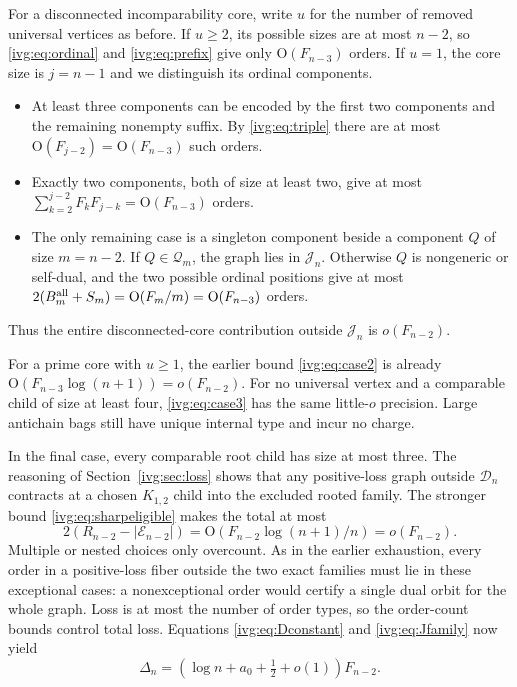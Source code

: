 \documentclass[11pt,letterpaper]{article}
\theoremstyle{definition}\newtheorem{definition}[theorem]{Definition}
\theoremstyle{remark}\newtheorem{remark}[theorem]{Remark}
\newcommand{\OO}{\mathrm O}
\begin{document}
For a disconnected incomparability core, write $u$ for the number of removed universal vertices as before. If $u\ge2$, its possible sizes are at most $n-2$, so \eqref{ivg:eq:ordinal} and \eqref{ivg:eq:prefix} give only $\OO(F_{n-3})$ orders. If $u=1$, the core size is $j=n-1$ and we distinguish its ordinal components.
\begin{itemize}
\item At least three components can be encoded by the first two components and the remaining nonempty suffix. By \eqref{ivg:eq:triple} there are at most $\OO(F_{j-2})=\OO(F_{n-3})$ such orders.
\item Exactly two components, both of size at least two, give at most $\sum_{k=2}^{j-2}F_kF_{j-k}=\OO(F_{n-3})$ orders.
\item The only remaining case is a singleton component beside a component $Q$ of size $m=n-2$. If $Q\in\mathcal Q_m$, the graph lies in $\mathcal J_n$. Otherwise $Q$ is nongeneric or self-dual, and the two possible ordinal positions give at most $2(B_m^{\rm all}+S_m)=\OO(F_m/m)=\OO(F_{n-3})$ orders.
\end{itemize}
Thus the entire disconnected-core contribution outside $\mathcal J_n$ is $o(F_{n-2})$.

For a prime core with $u\ge1$, the earlier bound \eqref{ivg:eq:case2} is already $\OO(F_{n-3}\log(n+1))=o(F_{n-2})$. For no universal vertex and a comparable child of size at least four, \eqref{ivg:eq:case3} has the same little-$o$ precision. Large antichain bags still have unique internal type and incur no charge.

In the final case, every comparable root child has size at most three. The reasoning of Section~\ref{ivg:sec:loss} shows that any positive-loss graph outside $\mathcal D_n$ contracts at a chosen $K_{1,2}$ child into the excluded rooted family. The stronger bound \eqref{ivg:eq:sharpeligible} makes the total at most
\[
 2(R_{n-2}-|\mathcal E_{n-2}|)
 =\OO(F_{n-2}\log(n+1)/n)=o(F_{n-2}).
\]
Multiple or nested choices only overcount. As in the earlier exhaustion, every order in a positive-loss fiber outside the two exact families must lie in these exceptional cases: a nonexceptional order would certify a single dual orbit for the whole graph. Loss is at most the number of order types, so the order-count bounds control total loss. Equations \eqref{ivg:eq:Dconstant} and \eqref{ivg:eq:Jfamily} now yield
\begin{equation}\label{ivg:eq:Deltaconstant}
 \Delta_n=(\log n+a_0+\tfrac12+o(1))F_{n-2}.
\end{equation}
\end{document}
